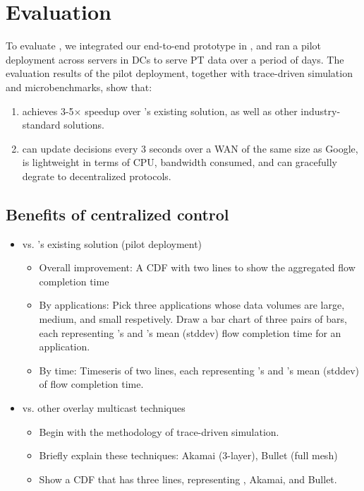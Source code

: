 \section{Evaluation}

To evaluate \name, we integrated our end-to-end prototype in \company, and ran a pilot deployment across \fillme servers in \fillme DCs to serve \fillme PT data over a period of \fillme days. 
The evaluation results of the pilot deployment, together with trace-driven simulation and microbenchmarks, show that:
\begin{enumerate}
\item \name achieves 3-5$\times$ speedup over \company's existing solution, as well as other industry-standard solutions.
\item \name can update decisions every 3 seconds over a WAN of the same size as Google, is lightweight in terms of CPU, bandwidth consumed, and can gracefully degrate to decentralized protocols.
\end{enumerate}

\subsection{Benefits of centralized control}
\begin{itemize}
\item \name vs. \company's existing solution (pilot deployment)
\begin{itemize}
\item Overall improvement: A CDF with two lines to show the aggregated flow completion time
\item By applications: Pick three applications whose data volumes are large, medium, and small respetively. Draw a bar chart of three pairs of bars, each representing \name's and \company's mean (stddev) flow completion time for an application.
\item By time: Timeseris of two lines, each representing \name's and \company's mean (stddev) of flow completion time.
\end{itemize}

\item \name vs. other overlay multicast techniques
\begin{itemize}
\item Begin with the methodology of trace-driven simulation.
\item Briefly explain these techniques: Akamai (3-layer), Bullet (full mesh)
\item Show a CDF that has three lines, representing \name, Akamai, and Bullet.
\end{itemize}

\end{itemize}

